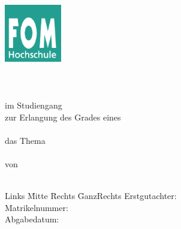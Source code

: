 \begin{titlepage}
	\begin{center}
		\includegraphics[width=2.5cm]{Abbildungen/fom_logo.png} \\
		\vspace{0.5cm}
		\Large\textbf{\myHochschulName}\\
		\myHochschulStandort\\
		\vspace{2cm}
		\textbf{\myThesisArt}\\
		\vspace{0.5cm}
		\normalsize im Studiengang \myStudiengang\\
		\vspace{1.5cm}
		zur Erlangung des Grades eines\\
		\vspace{0.2cm}
		\Large \myAkademischerGrad\\
		\vspace{1.5cm}
		 das Thema\\
		\vspace{0.5cm}
		\textbf{\Large{\myTitel}}\\
		\vspace{2.5cm}
		von\\
		\Large{\myAutor}\\
	\end{center}
	\normalsize
	\vfill
	\begin{tabbing}
		Links \= Mitte \= Rechts  \= GanzRechts\kill
		Erstgutachter: \> \> \> \myBetreuer\\
		Matrikelnummer: \> \> \> \myMatrikelNr\\
		Abgabedatum: \> \> \> \myAbgabeDatum
	\end{tabbing}
\end{titlepage}

